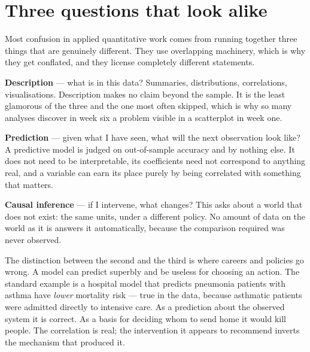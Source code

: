 \documentclass[
  letterpaper,
  10pt,
  twoside,
  openright,
  numbers=noenddot,
  chapterprefix=true]{scrbook}
\begin{document}
\section{Three questions that look
alike}\label{three-questions-that-look-alike}

Most confusion in applied quantitative work comes from running together
three things that are genuinely different. They use overlapping
machinery, which is why they get conflated, and they license completely
different statements.

\begin{qmibdefinition}

{\textbf{Description}} --- what is in this data? Summaries,
distributions, correlations, visualisations. Description makes no claim
beyond the sample. It is the least glamorous of the three and the one
most often skipped, which is why so many analyses discover in week six a
problem visible in a scatterplot in week one.

\end{qmibdefinition}

\begin{qmibdefinition}

{\textbf{Prediction}} --- given what I have seen, what will the next
observation look like? A predictive model is judged on out-of-sample
accuracy and by nothing else. It does not need to be interpretable, its
coefficients need not correspond to anything real, and a variable can
earn its place purely by being correlated with something that matters.

\end{qmibdefinition}

\begin{qmibdefinition}

{\textbf{Causal inference}} --- if I intervene, what changes? This asks
about a world that does not exist: the same units, under a different
policy. No amount of data on the world as it is answers it
automatically, because the comparison required was never observed.

\end{qmibdefinition}

The distinction between the second and the third is where careers and
policies go wrong. A model can predict superbly and be useless for
choosing an action. The standard example is a hospital model that
predicts pneumonia patients with asthma have \emph{lower} mortality risk
--- true in the data, because asthmatic patients were admitted directly
to intensive care. As a prediction about the observed system it is
correct. As a basis for deciding whom to send home it would kill people.
The correlation is real; the intervention it appears to recommend
inverts the mechanism that produced it.
\end{document}

